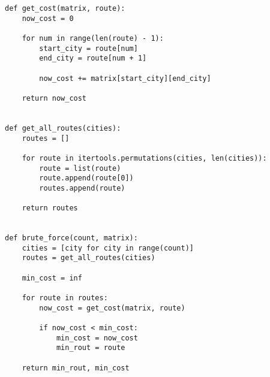 \begin{center}
\captionsetup{justification=raggedright,singlelinecheck=off}
\begin{lstlisting}[label=lst:brute-force,caption=Полный перебор]
def get_cost(matrix, route):
    now_cost = 0

    for num in range(len(route) - 1):
        start_city = route[num]
        end_city = route[num + 1]

        now_cost += matrix[start_city][end_city]
    
    return now_cost


def get_all_routes(cities):
    routes = []

    for route in itertools.permutations(cities, len(cities)):
        route = list(route)
        route.append(route[0])
        routes.append(route)
    
    return routes


def brute_force(count, matrix):
    cities = [city for city in range(count)]
    routes = get_all_routes(cities)

    min_cost = inf

    for route in routes:
        now_cost = get_cost(matrix, route)

        if now_cost < min_cost:
            min_cost = now_cost
            min_rout = route
    
    return min_rout, min_cost
\end{lstlisting} 
\end{center}

